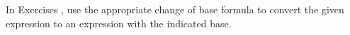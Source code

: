 {\noindent  In Exercises}
{, use the appropriate change of base formula to convert the given expression to an expression with the indicated base. 
}
